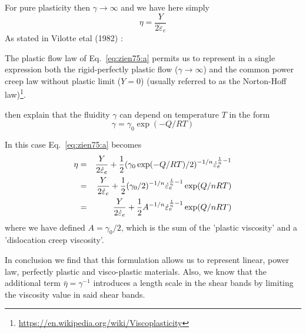 For pure plasticity then $\gamma \rightarrow \infty$ and we have here simply
\[
\eta = \frac{Y}{2  \dot\varepsilon_e}
\]
As stated in Vilotte etal (1982) \cite{vidm82}: 
\begin{displayquote}
{\color{darkgray}
The plastic flow law of Eq.~\eqref{eq:zien75:a} permits us to
represent in a single expression both the rigid-perfectly plastic flow
($\gamma\rightarrow \infty$)
and the common power creep law without plastic limit ($Y=0$)
(usually referred to as the Norton-Hoff law)\footnote{\url{https://en.wikipedia.org/wiki/Viscoplasticity}}.}
\end{displayquote}
\textcite{vidm82} then explain that the fluidity $\gamma$ can depend on temperature $T$ in the form 
\[
\gamma = \gamma_0 \exp(-Q/RT)
\]

In this case Eq.~\eqref{eq:zien75:a} becomes
\begin{eqnarray}
\eta 
&=& \frac{ Y }{2  \dot\varepsilon_e} + \frac{1 }{2 } ( \gamma_0 \exp(-Q/RT) /2)^{-1/n}  \dot\varepsilon_e^{\frac1n-1}  \nonumber\\
&=& \frac{ Y }{2  \dot\varepsilon_e} + \frac{1 }{2 } ( \gamma_0 /2)^{-1/n}  \dot\varepsilon_e^{\frac1n-1}  \exp(Q/nRT) \nonumber\\
&=& \frac{ Y }{2  \dot\varepsilon_e} + \frac{1 }{2 } A^{-1/n}  \dot\varepsilon_e^{\frac1n-1}  \exp(Q/nRT) 
\end{eqnarray}
where we have defined $A=\gamma_0/2$,
which is the sum of the 'plastic viscosity' and a 'dislocation creep viscosity'.

In conclusion we find that this formulation allows us to represent linear, power law,
perfectly plastic and visco-plastic materials.
Also, we know that the additional term $\bar\eta=\gamma^{-1}$ introduces a length scale
in the shear bands by limiting the viscosity value in said shear bands.



